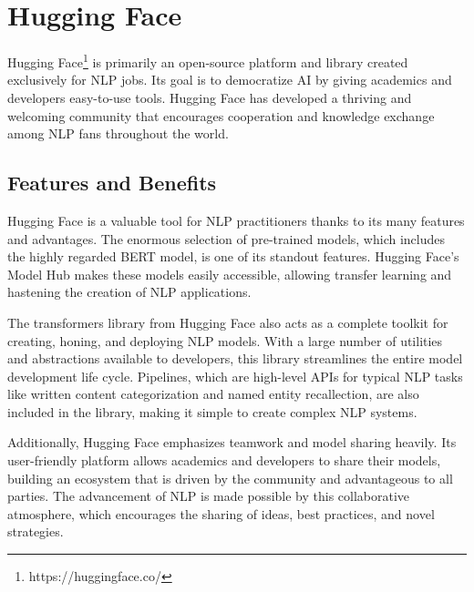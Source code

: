 

\section{Hugging Face}

Hugging Face\footnote{https://huggingface.co/} is primarily an open-source platform and library created exclusively for NLP jobs. Its goal is to democratize AI by giving academics and developers easy-to-use tools. Hugging Face has developed a thriving and welcoming community that encourages cooperation and knowledge exchange among NLP fans throughout the world.

\subsection{Features and Benefits}
Hugging Face is a valuable tool for NLP practitioners thanks to its many features and advantages. The enormous selection of pre-trained models, which includes the highly regarded BERT model, is one of its standout features. Hugging Face's Model Hub makes these models easily accessible, allowing transfer learning and hastening the creation of NLP applications.



The transformers library from Hugging Face also acts as a complete toolkit for creating, honing, and deploying NLP models. With a large number of utilities and abstractions available to developers, this library streamlines the entire model development life cycle. Pipelines, which are high-level APIs for typical NLP tasks like written content categorization and named entity recallection, are also included in the library, making it simple to create complex NLP systems.

Additionally, Hugging Face emphasizes teamwork and model sharing heavily. Its user-friendly platform allows academics and developers to share their models, building an ecosystem that is driven by the community and advantageous to all parties. The advancement of NLP is made possible by this collaborative atmosphere, which encourages the sharing of ideas, best practices, and novel strategies.




